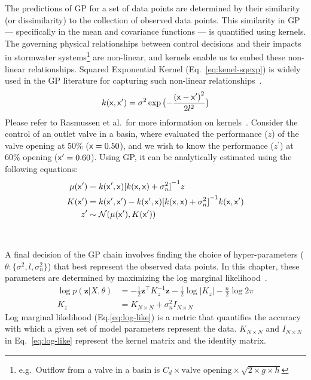 The predictions of GP for a set of data points are determined by their similarity (or dissimilarity) to the collection of observed data points.
This similarity in GP --- specifically in the mean and covariance functions --- is quantified using kernels.
The governing physical relationships between control decisions and their impacts in stormwater systems\footnote{e.g.\ Outflow from a valve in a basin is $C_d \times \text{valve opening} \times \sqrt{2 \times g \times h}$} are non-linear, and kernels enable us to embed these non-linear relationships.
Squared Exponential Kernel (Eq.~\ref{eq:kenel-sqexp}) is widely used in the GP literature for capturing such non-linear relationships~\cite{Duvenaud}.
\begin{equation}\label{eq:kenel-sqexp}
	k({\mathsf{x}}, {\mathsf{x}}^\prime) = \sigma^2 \exp 	\big( {-\frac{{({\mathsf{x}} - {\mathsf{x}}^\prime)}^2}{2{l}^2}} \big)
\end{equation}
Please refer to Rasmussen et al.\ for more information on kernels~\cite{rasmussenGaussianProcessesMachine2006}. 
Consider the control of an outlet valve in a basin, where evaluated the performance ($z$) of the valve opening at 50\% (${\mathsf{x}}=0.50$), and we wish to know the performance ($z^\prime$) at 60\% opening (${\mathsf{x}}^\prime=0.60$). 
Using GP, it can be analytically estimated using the following equations:
\begin{subequations}\label{eq:me-cov}
\begin{align}	
	\mu({\mathsf{x}}^\prime) &= k({\mathsf{x}}^\prime, {\mathsf{x}}){[k({\mathsf{x}}, {\mathsf{x}}) + \sigma_n^2]}^{-1}z \\
	K({\mathsf{x}}^\prime) &= k({\mathsf{x}}^\prime, {\mathsf{x}}^\prime) - k({\mathsf{x}}^\prime, {\mathsf{x}}){[k({\mathsf{x}}, {\mathsf{x}}) + \sigma_n^2]}^{-1}k({\mathsf{x}}, {\mathsf{x}}^\prime)\\
	z^\prime &\sim \mathcal{N}(\mu({\mathsf{x}}^\prime), K({\mathsf{x}}^\prime))
\end{align}
\end{subequations}

\

A final decision of the GP chain involves finding the choice of hyper-parameters ($ \theta : \{ \sigma^2, l, \sigma_n^2 \}$) that best represent the observed data points.
In this chapter, these parameters are determined by maximizing the log marginal likelihood~\cite{rasmussenGaussianProcessesMachine2006}.
\begin{subequations}\label{eq:log-like}
\begin{align}
	\log p(\mathbf{z} | X, \theta) &= -\frac{1}{2} \mathbf{z}^{\top} K_{z}^{-1} \mathbf{z}-\frac{1}{2} \log \left|K_{z}\right|-\frac{n}{2} \log 2 \pi \\
	K_z &= K_{N \times N} + \sigma_n^2 I_{N \times N}
\end{align}
\end{subequations}
Log marginal likelihood (Eq.\ref{eq:log-like}) is a metric that quantifies the accuracy with which a given set of model parameters represent the data.
$K_{N \times N}$ and $I_{N \times N}$ in Eq.~\ref{eq:log-like} represent the kernel matrix and the identity matrix.



